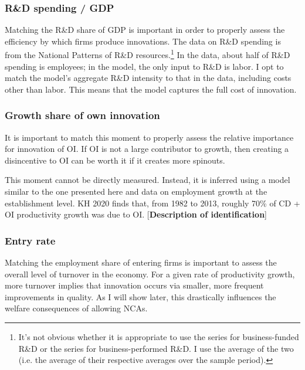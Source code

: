 \documentclass[11pt,english]{article}
\theoremstyle{remark}
\begin{document}
\subsubsection{R\&D spending / GDP}

Matching the R\&D share of GDP is important in order to properly assess the efficiency by which firms produce innovations. The data on R\&D spending is from the National Patterns of R\&D resources.\footnote{It's not obvious whether it is appropriate to use the series for business-funded R\&D or the series for business-performed R\&D. I use the average of the two (i.e. the average of their respective averages over the sample period).} In the data, about half of R\&D spending is employees; in the model, the only input to R\&D is labor. I opt to match the model's aggregate R\&D intensity to that in the data, including costs other than labor. This means that the model captures the full cost of innovation. 

\subsubsection{Growth share of own innovation}

It is important to match this moment to properly assess the relative importance for innovation of OI. If OI is not a large contributor to growth, then creating a disincentive to OI can be worth it if it creates more spinouts. 

This moment cannot be directly measured. Instead, it is inferred using a model similar to the one presented here and data on employment growth at the establishment level. KH 2020 finds that, from 1982 to 2013, roughly 70\% of CD + OI productivity growth was due to OI. [\textbf{Description of identification}]

\subsubsection{Entry rate}

Matching the employment share of entering firms is important to assess the overall level of turnover in the economy. For a given rate of productivity growth, more turnover implies that innovation occurs via smaller, more frequent improvements in quality. As I will show later, this drastically influences the welfare consequences of allowing NCAs.
\end{document}
